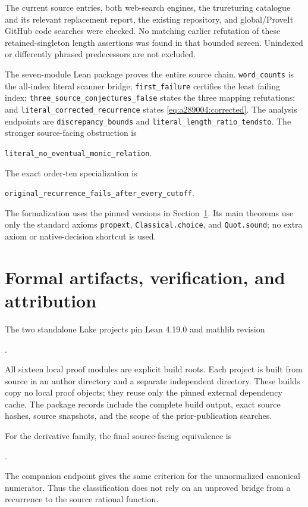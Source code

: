 \documentclass[11pt]{article}
\begin{document}
The current source entries, both web-search engines, the trureturing
catalogue and its relevant replacement report, the existing repository,
and global/ProveIt GitHub code searches were checked. No matching earlier
refutation of these retained-singleton length assertions was found in
that bounded screen. Unindexed or differently phrased predecessors
are not excluded.

The seven-module Lean package proves the entire source chain.
\texttt{word\_counts} is the all-index literal scanner bridge;
\texttt{first\_failure} certifies the least failing index;
\texttt{three\_source\_conjectures\_false} states the three mapping
refutations; and \texttt{literal\_corrected\_recurrence} states
\eqref{eq:a289004:corrected}. The analysis endpoints are
\texttt{discrepancy\_bounds} and
\texttt{literal\_length\_ratio\_tendsto}. The stronger source-facing
obstruction is
\begin{center}
\texttt{literal\_no\_eventual\_monic\_relation}.
\end{center}
The exact order-ten specialization is
\begin{center}
\texttt{original\_recurrence\_fails\_after\_every\_cutoff}.
\end{center}
The formalization uses the pinned versions in
Section~\ref{sec:verification}. Its main theorems use
only the standard axioms \texttt{propext}, \texttt{Classical.choice}, and
\texttt{Quot.sound}; no extra axiom or native-decision shortcut is used.

\section{Formal artifacts, verification, and attribution}
\label{sec:verification}

The two standalone Lake projects pin Lean 4.19.0 and mathlib revision
\begin{center}
.
\end{center}
All sixteen local proof modules are explicit build roots.  Each project
is built from source in an author directory and a separate independent
directory.  These builds copy no local proof objects; they reuse only
the pinned external dependency cache.  The package records include
the complete build output, exact source hashes, source snapshots, and
the scope of the prior-publication searches.

For the derivative family, the final source-facing equivalence is
\begin{center}
.
\end{center}
The companion endpoint
gives the same criterion for the unnormalized canonical numerator.
Thus the classification does not rely on an unproved bridge from a
recurrence to the source rational function.
\end{document}
